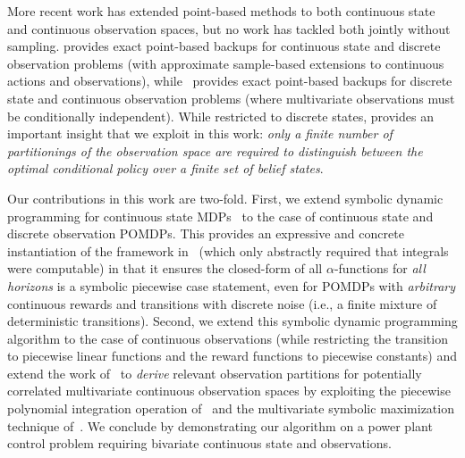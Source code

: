 \documentclass{article} %
\begin{document}
More recent work has extended point-based methods to both continuous
state and continuous observation spaces, but no work has tackled both
jointly without sampling.  \cite{Perseus_cont} provides exact
point-based backups for continuous state and discrete observation
problems (with approximate sample-based extensions to continuous
actions and observations), while~\cite{pascal_ijcai05} provides exact
point-based backups for discrete state and continuous observation
problems (where multivariate observations must be conditionally
independent).  While
restricted to discrete states, \cite{pascal_ijcai05} provides an
important insight that we exploit in this work: \emph{only a finite
number of partitionings of the observation space are required to
distinguish between the optimal conditional policy over a finite set
of belief states}.

Our contributions in this work are two-fold.  First, we extend
symbolic dynamic programming for continuous state
MDPs~\cite{sanner_uai11} to the case of continuous state and discrete
observation POMDPs.  This provides an expressive and concrete
instantiation of the framework in~\cite{Perseus_cont} (which only
abstractly required that integrals were computable) in that it ensures
the closed-form of all $\alpha$-functions for \emph{all horizons} is a
symbolic piecewise case statement, even for POMDPs with
\emph{arbitrary} continuous rewards and transitions with discrete
noise (i.e., a finite mixture of deterministic transitions).  
Second, we extend this symbolic dynamic programming algorithm
to the case of continuous observations (while restricting the
transition to piecewise linear functions and the reward functions to piecewise constants) and extend
the work of~\cite{pascal_ijcai05} to \emph{derive} relevant observation
partitions for potentially correlated multivariate continuous
observation spaces by exploiting the piecewise polynomial integration
operation of~\cite{sanner_aaai12} and the multivariate symbolic maximization
technique of~\cite{sanner_uai11}.  
We conclude by demonstrating our algorithm on a power plant
control problem requiring bivariate continuous state and observations.


\end{document}
